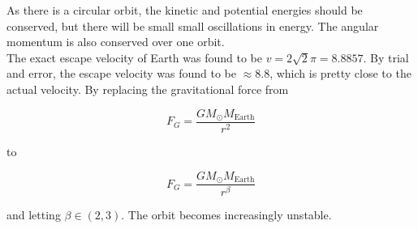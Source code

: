 \documentclass[10pt,a4paper]{article}
\begin{document}
\noindent As there is a circular orbit, the kinetic and potential energies should be conserved, but there will be small small oscillations in energy. The angular momentum is also conserved over one orbit.\\



\noindent The exact escape velocity of Earth was found to be $v=2\sqrt{2}\pi=8.8857$. By trial and error, the escape velocity was found to be $\approx 8.8$, which is pretty close to the actual velocity. By replacing the gravitational force from

$$
F_G=\frac{GM_{\odot}M_{\mathrm{Earth}}}{r^2}
$$

to

$$
F_G=\frac{GM_{\odot}M_{\mathrm{Earth}}}{r^{\beta}}
$$

\noindent and letting $\beta\in(2,3)$. The orbit becomes increasingly unstable.\\
\end{document}
